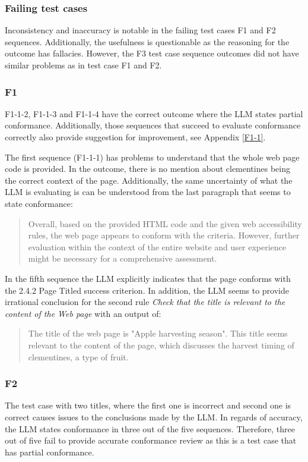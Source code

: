 \subsubsection{Failing test cases}

Inconsistency and inaccuracy is notable in the failing test cases F1 and F2 sequences. Additionally, the usefulness is questionable as the reasoning for the outcome has fallacies. However, the F3 test case sequence outcomes did not have similar problems as in test case F1 and F2.

\subsubsection{F1}

F1-1-2, F1-1-3 and F1-1-4 have the correct outcome where the LLM states partial conformance. Additionally, those sequences that succeed to evaluate conformance correctly also provide suggestion for improvement, see Appendix \ref{F1-1}.

The first sequence (F1-1-1) has problems to understand that the whole web page code is provided. In the outcome, there is no mention about clementines being the correct context of the page. Additionally, the same uncertainty of what the LLM is evaluating is can be understood from the last paragraph that seems to state conformance:

\blockquote{Overall, based on the provided HTML code and the given web accessibility rules, the web page appears to conform with the criteria. However, further evaluation within the context of the entire website and user experience might be necessary for a comprehensive assessment.}

In the fifth sequence the LLM explicitly indicates that the page conforms with the 2.4.2 Page Titled success criterion. In addition, the LLM seems to provide irrational conclusion for the second rule \textit{Check that the title is relevant to the content of the Web page} with an output of:

\blockquote{The title of the web page is "Apple harvesting season". This title seems relevant to the content of the page, which discusses the harvest timing of clementines, a type of fruit.}

\subsubsection{F2}

The test case with two titles, where the first one is incorrect and second one is correct causes issues to the conclusions made by the LLM. In regards of accuracy, the LLM states conformance in three out of the five sequences. Therefore, three out of five fail to provide accurate conformance review as this is a test case that has partial conformance.

